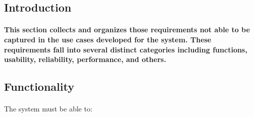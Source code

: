 \subsection{Introduction}
\paragraph{This section collects and organizes those requirements not able to be captured in the use cases developed for the system. These requirements fall into several distinct categories including functions, usability, reliability, performance, and others.}
\subsection{Functionality}
\paragraph{}The system must be able to:
